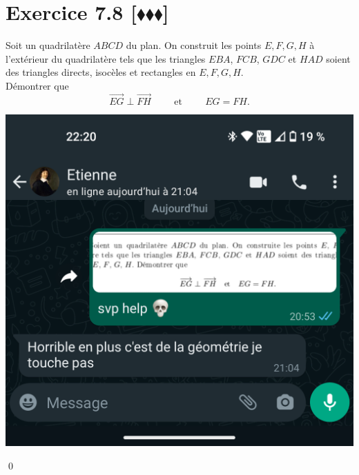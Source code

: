 \documentclass[10pt]{article}
\begin{document}

\section*{Exercice 7.8 [$\blacklozenge\blacklozenge\blacklozenge$]}
\begin{tcolorbox}[enhanced, width=7in, center, size=fbox, fontupper=\large, drop shadow southwest]
    Soit un quadrilatère $ABCD$ du plan. On construit les points $E, F, G, H$ à l'extérieur du quadrilatère tels que les triangles $EBA$, $FCB$, $GDC$ et $HAD$ soient des triangles directs, isocèles et rectangles en $E, F, G, H$.\\
    Démontrer que
    \begin{equation*}
        \overrightarrow{EG} \perp \overrightarrow{FH} \hspace{1cm} \text{et} \hspace{1cm} EG = FH.
    \end{equation*}
    \begin{center}
        \includegraphics*[scale=0.17]{./goat.png}
    \end{center}
    \qed
\end{tcolorbox}

\end{document}
